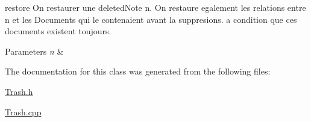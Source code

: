 restore On restaurer une deleted\-Note n. On restaure egalement les relations entre n et les Documents qui le contenaient avant la suppresions. a condition que ces documents existent toujours. 


\begin{DoxyParams}{Parameters}
{\em n} & \\
\hline
\end{DoxyParams}


The documentation for this class was generated from the following files\-:\begin{DoxyCompactItemize}
\item 
\hyperlink{_trash_8h}{Trash.\-h}\item 
\hyperlink{_trash_8cpp}{Trash.\-cpp}\end{DoxyCompactItemize}
